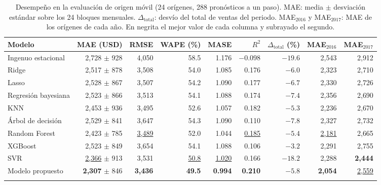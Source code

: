 \documentclass[pdflatex,sn-mathphys-num]{sn-jnl}
\begin{document}
\begin{table}[!htb]
\caption{Desempeño en la evaluación de origen móvil (24 orígenes, 288 pronósticos a un paso). MAE: media $\pm$ desviación estándar sobre los 24 bloques mensuales. $\Delta_{\mathrm{total}}$: desvío del total de ventas del periodo. MAE$_{2016}$ y MAE$_{2017}$: MAE de los orígenes de cada año. En negrita el mejor valor de cada columna y subrayado el segundo.}\label{tab:resultados}
\footnotesize
\begin{tabular*}{\textwidth}{@{\extracolsep\fill}lrrrrrrrr}
\toprule
Modelo & MAE (USD) & RMSE & WAPE (\%) & MASE & $R^2$ & $\Delta_{\mathrm{total}}$ (\%) & MAE$_{2016}$ & MAE$_{2017}$ \\
\midrule
Ingenuo estacional & 2{,}728 $\pm$ 928 & 4{,}050 & 58.5 & 1.176 & $-0.098$ & $-19.6$ & 2{,}543 & 2{,}912 \\
Ridge & 2{,}517 $\pm$ 878 & 3{,}508 & 54.0 & 1.085 & 0.176 & $-6.0$ & 2{,}323 & 2{,}710 \\
Lasso & 2{,}528 $\pm$ 867 & 3{,}507 & 54.2 & 1.090 & 0.177 & $-6.7$ & 2{,}330 & 2{,}726 \\
Regresión bayesiana & 2{,}523 $\pm$ 866 & 3{,}513 & 54.1 & 1.088 & 0.174 & $-7.4$ & 2{,}356 & 2{,}690 \\
KNN & 2{,}453 $\pm$ 936 & 3{,}495 & 52.6 & 1.057 & 0.182 & \underline{$-5.3$} & 2{,}236 & 2{,}670 \\
Árbol de decisión & 2{,}529 $\pm$ 841 & 3{,}647 & 54.3 & 1.090 & 0.110 & $-7.8$ & 2{,}327 & 2{,}732 \\
Random Forest & 2{,}423 $\pm$ 785 & \underline{3{,}489} & 52.0 & 1.044 & \underline{0.185} & $-5.4$ & \underline{2{,}181} & 2{,}665 \\
XGBoost & 2{,}523 $\pm$ 849 & 3{,}654 & 54.1 & 1.088 & 0.106 & $\mathbf{-3.2}$ & 2{,}291 & 2{,}755 \\
SVR & \underline{2{,}366} $\pm$ 913 & 3{,}531 & \underline{50.8} & \underline{1.020} & 0.166 & $-18.2$ & 2{,}288 & \textbf{2{,}444} \\
Modelo propuesto & \textbf{2{,}307} $\pm$ 846 & \textbf{3{,}436} & \textbf{49.5} & \textbf{0.994} & \textbf{0.210} & $-5.8$ & \textbf{2{,}054} & \underline{2{,}559} \\
\botrule
\end{tabular*}
\end{table}
\end{document}
